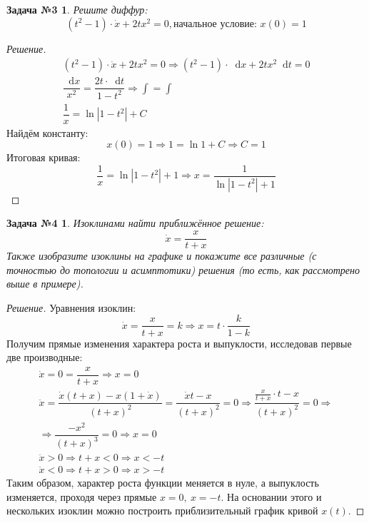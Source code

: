 \documentclass[a4paper,12pt]{article}
\newtheorem*{task3}{Задача №3}
\newtheorem*{task4}{Задача №4}
\renewcommand*\d{\mathop{}\!\mathrm{d}}
\newcommand{\dx}{\dot{x}}
\newcommand{\ddx}{\ddot{x}}
\newcommand{\ds}{\displaystyle}
\begin{document}
\begin{task3}
	Решите диффур: 	\[(t^2 - 1) \cdot \dot{x} + 2tx^2 = 0, \text{начальное условие: }x(0) = 1\]
\end{task3}
\begin{proof}[Решение]
	\begin{gather*}
		(t^2 - 1)\cdot \dx + 2tx^2 = 0 \Longrightarrow (t^2 - 1)\cdot \d x + 2tx^2\d t = 0\\
		\dfrac{\d x}{x^2} = \dfrac{2t \cdot \d t}{1 - t^2}\Longrightarrow \ds\int = \int\\
		\dfrac{1}{x} = \ln|1-t^2| + C
	\end{gather*}
	Найдём константу: \[x(0) = 1 \Longrightarrow 1 = \ln 1 + C \Longrightarrow C = 1\]
	Итоговая кривая:
	\[\dfrac{1}{x} = \ln|1 - t^2| + 1 \Longrightarrow x = \dfrac{1}{\ln|1 - t^2| + 1}\]
\end{proof}

\begin{task4}
	Изоклинами найти приближённое решение: 	\[\dot{x} = \dfrac{x}{t + x}\]
	Также изобразите изоклины на графике и покажите все различные (с точностью до топологии и асимптотики) решения (то есть, как рассмотрено выше в примере).
\end{task4}
\begin{proof}[Решение]
	Уравнения изоклин:
	\[\dx = \dfrac{x}{t + x} = k \Longrightarrow x = t \cdot \dfrac{k}{1 - k}\] Получим прямые изменения характера роста и выпуклости, исследовав первые две производные:
	\begin{gather*}
		\dx = 0 = \dfrac{x}{t + x} \Longrightarrow x = 0\\
		\ddx = \dfrac{\dx(t + x) - x(1 + \dx)}{(t + x)^2} = \dfrac{\dx t - x}{(t + x)^2} = 0 \Longrightarrow \dfrac{\frac{x}{t + x} \cdot t - x}{(t + x)^2} = 0 \Longrightarrow \\
		\Longrightarrow \dfrac{-x^2}{(t + x)^3} = 0 \Longrightarrow x = 0\\
		\ddx > 0 \Longrightarrow t + x < 0 \Longrightarrow x < -t\\
		\ddx < 0 \Longrightarrow t + x > 0 \Longrightarrow x > -t
	\end{gather*}
	Таким образом, характер роста функции меняется в нуле, а выпуклость изменяется, проходя через прямые $x = 0,\ x = -t$. На основании этого и нескольких изоклин можно построить приблизительный график кривой $x(t)$.
\end{proof}
\end{document}

